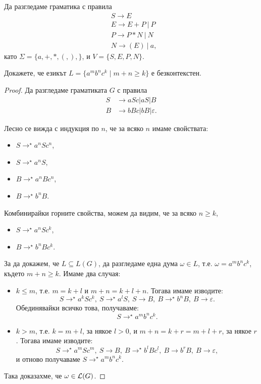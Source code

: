 \begin{example}
  Да разгледаме граматика с правила
  \begin{align*}
    & S \to E\\
    & E \to E + P\ |\ P\\
    & P \to P * N\ |\ N\\
    & N \to (E)\ |\ a,
  \end{align*}
  като $\Sigma = \{a,+,*,(,),\}$, и $V = \{S,E,P,N\}$.
\end{example}

\begin{problem}
  Докажете, че езикът $L = \{a^mb^nc^k\mid m+n \geq k\}$ е безконтекстен.
\end{problem}
\begin{proof}
  Да разгледаме граматиката $G$ с правила
  \begin{align*}
    S& \rightarrow aSc\vert aS \vert B\\
    B& \rightarrow bBc\vert bB\vert\varepsilon.
  \end{align*}
  
  Лесно се вижда с индукция по $n$, че за всяко $n$ имаме свойствата:
  \begin{itemize}
  \item 
    $S \rightarrow^\star a^nSc^n$,
  \item
    $S \rightarrow^\star a^nS$,
  \item
    $B \rightarrow^\star a^nBc^n$,
  \item
    $B \rightarrow^\star b^nB$.
  \end{itemize}
  Комбинирайки горните свойства, можем да видим, че за всяко $n \geq k$,
  \begin{itemize}
  \item 
    $S \rightarrow^\star a^nSc^k$,
  \item
    $B \rightarrow^\star b^nBc^k$.
  \end{itemize}
  За да докажем, че $L \subseteq L(G)$, 
  да разгледаме една дума $\omega \in L$, т.е. $\omega = a^mb^nc^k$, където $m+n \geq k$.
  Имаме два случая:
  \begin{itemize}
  \item 
    $k \leq m$, т.е. $m = k+l$ и $m+n = k+l+n$.
    Тогава имаме изводите:
    \[S \rightarrow^\star a^kSc^k,\ S \rightarrow^\star a^lS,\ S \rightarrow B,\ B \rightarrow^\star b^nB,\ B \rightarrow \varepsilon.\]
    Обединявайки всичко това, получаваме:
    \[S \rightarrow^\star a^mb^nc^k.\]
  \item
    $k > m$, т.е. $k = m+l$, за някое $l > 0$, и $m+n = k+r = m+l+r$, за някое $r$.
    Тогава имаме изводите:
    \[S \rightarrow^\star a^mSc^m,\ S\rightarrow B,\ B\rightarrow^\star b^lBc^l,\ B\rightarrow b^rB,\ B\rightarrow\varepsilon,\]
    и отново получаваме $S \rightarrow^\star a^mb^nc^k$.
  \end{itemize}
  Така доказахме, че $\omega \in \mathcal{L}(G)$.
  

\end{proof}
